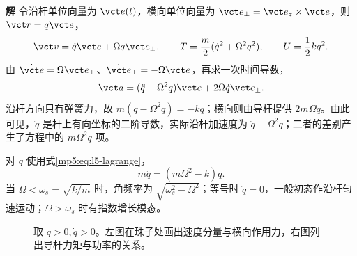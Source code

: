 \documentclass[11pt,openany,fontset=fandol]{ctexbook}
\theoremstyle{definition}\newtheorem{example}{例}[chapter]\newtheorem{exercise}{习题}[chapter]
\newcommand{\SolutionStart}{\par\medskip\ifdim\pagetotal>0pt\ifdim\dimexpr\pagegoal-\pagetotal\relax<3\baselineskip\newpage\fi\fi\noindent\textbf{解}\quad\ignorespaces}
\newenvironment{solution}{\SolutionStart}{\par\medskip}
\begin{document}
\begin{solution}
令沿杆单位向量为 $\vct e(t)$，横向单位向量为 $\vct e_\perp=\vct e_z\times\vct e$，则 $\vct r=q\vct e$，
\[
\vct v=\dot q\vct e+\Omega q\vct e_\perp,
\qquad
T=\frac m2(\dot q^2+\Omega^2q^2),\qquad U=\frac12kq^2.
\]
由 $\dot{\vct e}=\Omega\vct e_\perp$、$\dot{\vct e}_\perp=-\Omega\vct e$，再求一次时间导数，
\[
\vct a=(\ddot q-\Omega^2q)\vct e+2\Omega\dot q\vct e_\perp.
\]
沿杆方向只有弹簧力，故 $m(\ddot q-\Omega^2q)=-kq$；横向则由导杆提供 $2m\Omega\dot q$。由此可见，$\ddot q$ 是杆上有向坐标的二阶导数，实际沿杆加速度为 $\ddot q-\Omega^2q$；二者的差别产生了方程中的 $m\Omega^2q$ 项。

对 $q$ 使用式\eqref{mp5:eq:l5-lagrange}，
\begin{equation}\label{mp5:eq:l5-rotating-rod}
m\ddot q=(m\Omega^2-k)q.
\end{equation}
当 $\Omega<\omega_s=\sqrt{k/m}$ 时，角频率为 $\sqrt{\omega_s^2-\Omega^2}$；等号时 $\ddot q=0$，一般初态作沿杆匀速运动；$\Omega>\omega_s$ 时有指数增长模态。

\begin{figure}[H]\centering
{}
\caption{取 $q>0,\dot q>0$。左图在珠子处画出速度分量与横向作用力，右图列出导杆力矩与功率的关系。}\label{mp5:fig:l5-e2-s}
\end{figure}


\end{solution}
\end{document}
